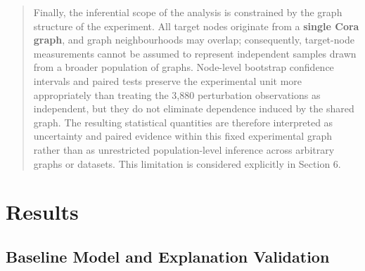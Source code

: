 \documentclass[a4paper]{article}
\begin{document}
\begin{quote}
Finally, the inferential scope of the analysis is constrained by the
graph structure of the experiment. All target nodes originate from a
\textbf{single Cora graph}, and graph neighbourhoods may overlap;
consequently, target-node measurements cannot be assumed to represent
independent samples drawn from a broader population of graphs.
Node-level bootstrap confidence intervals and paired tests preserve the
experimental unit more appropriately than treating the 3,880
perturbation observations as independent, but they do not eliminate
dependence induced by the shared graph. The resulting statistical
quantities are therefore interpreted as uncertainty and paired evidence
within this fixed experimental graph rather than as unrestricted
population-level inference across arbitrary graphs or datasets. This
limitation is considered explicitly in Section 6.
\end{quote}

\section{\texorpdfstring{Results }{Results }}\label{results}

\subsection{Baseline Model and Explanation
Validation}\label{baseline-model-and-explanation-validation}
\end{document}
